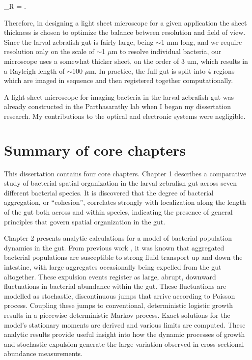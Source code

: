 \be
\ell_R = .
\ee

Therefore, in designing a light sheet microscope for a given application the sheet thickness is chosen to optimize the balance between resolution and field of view. Since the larval zebrafish gut is fairly large, being $\sim$1 mm long, and we require resolution only on the scale of $\sim$1 $\mu$m to resolve individual bacteria, our microscope uses a somewhat thicker sheet, on the order of 3 um, which results in a Rayleigh length of $\sim$100 $\mu$m. In practice, the full gut is split into 4 regions which are imaged in sequence and then registered together computationally.

A light sheet microscope for imaging bacteria in the larval zebrafish gut was already constructed in the Parthasarathy lab when I began my dissertation research. My contributions to the optical and electronic systems were negligible. 

\section{Summary of core chapters}
This dissertation contains four core chapters. Chapter 1 describes a comparative study of bacterial spatial organization in the larval zebrafish gut across seven different bacterial species. It is discovered that the degree of bacterial aggregation, or “cohesion”, correlates strongly with localization along the length of the gut both across and within species, indicating the presence of general principles that govern spatial organization in the gut. 

Chapter 2 presents analytic calculations for a model of bacterial population dynamics in the gut. From previous work \cite{wiles_host_2016}, it was known that aggregated bacterial populations are susceptible to strong fluid transport up and down the intestine, with large aggregates occasionally being expelled from the gut altogether. These expulsion events register as large, abrupt, downward fluctuations in bacterial abundance within the gut. These fluctuations are modelled as stochastic, discontinuous jumps that arrive according to Poisson process. Coupling these jumps to conventional, deterministic logistic growth results in a piecewise deterministic Markov process. Exact solutions for the model's stationary moments are derived and various limits are computed. These analytic results provide useful insight into how the dynamic processes of growth and stochastic expulsion generate the large variation observed in cross-sectional abundance measurements.

